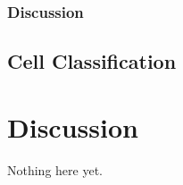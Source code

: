 \documentclass[altfont, fleqn]{uiophd}
\begin{document}
\subsection{Discussion}

\section{Cell Classification}
\chapter{Discussion}
Nothing here yet.


\end{document}
